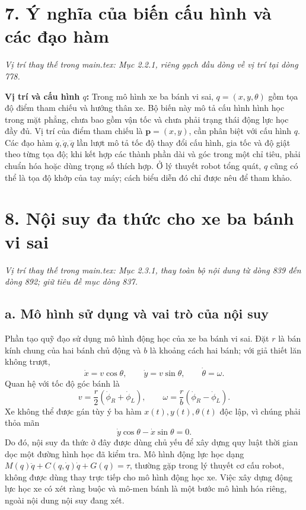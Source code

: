 \documentclass[12pt,a4paper,oneside]{report}
\newcommand{\vitri}[1]{\par\noindent\textit{Vị trí thay thế trong main.tex: #1.}\par}
\begin{document}
\section*{7. Ý nghĩa của biến cấu hình và các đạo hàm}
\vitri{Mục 2.2.1, riêng gạch đầu dòng về vị trí tại dòng 778}

\noindent\textbf{Vị trí và cấu hình \(q\):} Trong mô hình xe ba bánh vi sai, \(q=(x,y,\theta)\) gồm tọa độ điểm tham chiếu và hướng thân xe. Bộ biến này mô tả cấu hình hình học trong mặt phẳng, chưa bao gồm vận tốc và chưa phải trạng thái động lực học đầy đủ. Vị trí của điểm tham chiếu là \(\mathbf p=(x,y)\), cần phân biệt với cấu hình \(q\). Các đạo hàm \(\dot q,\ddot q,\dddot q\) lần lượt mô tả tốc độ thay đổi cấu hình, gia tốc và độ giật theo từng tọa độ; khi kết hợp các thành phần dài và góc trong một chỉ tiêu, phải chuẩn hóa hoặc dùng trọng số thích hợp. Ở lý thuyết robot tổng quát, \(q\) cũng có thể là tọa độ khớp của tay máy; cách biểu diễn đó chỉ được nêu để tham khảo.

\section*{8. Nội suy đa thức cho xe ba bánh vi sai}
\vitri{Mục 2.3.1, thay toàn bộ nội dung từ dòng 839 đến dòng 892; giữ tiêu đề mục dòng 837}

\subsection*{a. Mô hình sử dụng và vai trò của nội suy}

Phần tạo quỹ đạo sử dụng mô hình động học của xe ba bánh vi sai. Đặt \(r\) là bán kính chung của hai bánh chủ động và \(b\) là khoảng cách hai bánh; với giả thiết lăn không trượt,
\[
  \dot x=v\cos\theta,\qquad
  \dot y=v\sin\theta,\qquad
  \dot\theta=\omega.
\]
Quan hệ với tốc độ góc bánh là
\[
  v=\frac r2(\dot\phi_R+\dot\phi_L),\qquad
  \omega=\frac r b(\dot\phi_R-\dot\phi_L).
\]
Xe không thể được gán tùy ý ba hàm \(x(t),y(t),\theta(t)\) độc lập, vì chúng phải thỏa mãn
\[
  \dot y\cos\theta-\dot x\sin\theta=0.
\]
Do đó, nội suy đa thức ở đây được dùng chủ yếu để xây dựng quy luật thời gian dọc một đường hình học đã kiểm tra. Mô hình động lực học dạng \(M(q)\ddot q+C(q,\dot q)\dot q+G(q)=\tau\), thường gặp trong lý thuyết cơ cấu robot, không được dùng thay trực tiếp cho mô hình động học xe. Việc xây dựng động lực học xe có xét ràng buộc và mô-men bánh là một bước mô hình hóa riêng, ngoài nội dung nội suy đang xét.
\end{document}
